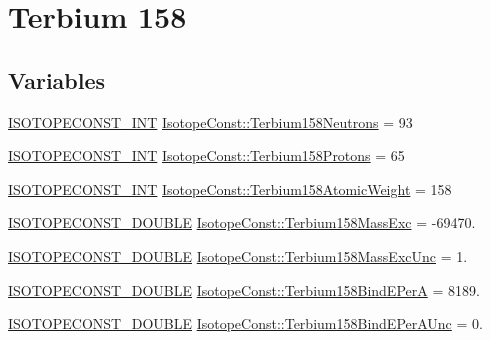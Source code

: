 \hypertarget{group___isotope_const-_terbium-_tb158}{}\section{Terbium 158}
\label{group___isotope_const-_terbium-_tb158}
\subsection*{Variables}
\begin{DoxyCompactItemize}
\item 
\mbox{\hyperlink{group___isotope_const-_macros_ga5f18360b3e99483a35c32d789e62621c}{I\+S\+O\+T\+O\+P\+E\+C\+O\+N\+S\+T\+\_\+\+I\+NT}} \mbox{\hyperlink{group___isotope_const-_terbium-_tb158_ga0483b51a0d31c580725a180442251988}{Isotope\+Const\+::\+Terbium158\+Neutrons}} = 93
\item 
\mbox{\hyperlink{group___isotope_const-_macros_ga5f18360b3e99483a35c32d789e62621c}{I\+S\+O\+T\+O\+P\+E\+C\+O\+N\+S\+T\+\_\+\+I\+NT}} \mbox{\hyperlink{group___isotope_const-_terbium-_tb158_gacf46d664dbd1acb6b89485f6388711b8}{Isotope\+Const\+::\+Terbium158\+Protons}} = 65
\item 
\mbox{\hyperlink{group___isotope_const-_macros_ga5f18360b3e99483a35c32d789e62621c}{I\+S\+O\+T\+O\+P\+E\+C\+O\+N\+S\+T\+\_\+\+I\+NT}} \mbox{\hyperlink{group___isotope_const-_terbium-_tb158_ga21289202b69f66a8a1a619b4108b908e}{Isotope\+Const\+::\+Terbium158\+Atomic\+Weight}} = 158
\item 
\mbox{\hyperlink{group___isotope_const-_macros_ga8f45a7272ce02c0b4c65c44636ed719a}{I\+S\+O\+T\+O\+P\+E\+C\+O\+N\+S\+T\+\_\+\+D\+O\+U\+B\+LE}} \mbox{\hyperlink{group___isotope_const-_terbium-_tb158_gaa6be3dab18a3c5d0de01f88f54be49cf}{Isotope\+Const\+::\+Terbium158\+Mass\+Exc}} = -\/69470.
\item 
\mbox{\hyperlink{group___isotope_const-_macros_ga8f45a7272ce02c0b4c65c44636ed719a}{I\+S\+O\+T\+O\+P\+E\+C\+O\+N\+S\+T\+\_\+\+D\+O\+U\+B\+LE}} \mbox{\hyperlink{group___isotope_const-_terbium-_tb158_ga27cd90676e5e0e01d36aa00a22d265bb}{Isotope\+Const\+::\+Terbium158\+Mass\+Exc\+Unc}} = 1.
\item 
\mbox{\hyperlink{group___isotope_const-_macros_ga8f45a7272ce02c0b4c65c44636ed719a}{I\+S\+O\+T\+O\+P\+E\+C\+O\+N\+S\+T\+\_\+\+D\+O\+U\+B\+LE}} \mbox{\hyperlink{group___isotope_const-_terbium-_tb158_ga125de89d758ace2e5f13a064399babe4}{Isotope\+Const\+::\+Terbium158\+Bind\+E\+PerA}} = 8189.
\item 
\mbox{\hyperlink{group___isotope_const-_macros_ga8f45a7272ce02c0b4c65c44636ed719a}{I\+S\+O\+T\+O\+P\+E\+C\+O\+N\+S\+T\+\_\+\+D\+O\+U\+B\+LE}} \mbox{\hyperlink{group___isotope_const-_terbium-_tb158_gac1df865c91b6d49f532c51bb663ed965}{Isotope\+Const\+::\+Terbium158\+Bind\+E\+Per\+A\+Unc}} = 0.

\end{DoxyCompactItemize}
